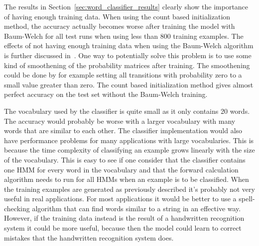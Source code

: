 The results in Section~\ref{sec:word_classifier_results} clearly show the importance of having enough training data.
When using the count based initialization method, the accuracy actually becomes worse after training the model with Baum-Welch for all test runs when using less than 800 training examples.
The effects of not having enough training data when using the Baum-Welch algorithm is further discussed in~\cite{Rabiner1989}.
One way to potentially solve this problem is to use some kind of smoothening of the probability matrices after training.
The smoothening could be done by for example setting all transitions with probability zero to a small value greater than zero.
The count based initialization method gives almost perfect accuracy on the test set without the Baum-Welch training.

The vocabulary used by the classifier is quite small as it only contains 20 words.
The accuracy would probably be worse with a larger vocabulary with many words that are similar to each other.
The classifier implementation would also have performance problems for many applications with large vocabularies.
This is because the time complexity of classifying an example grows linearly with the size of the vocabulary.
This is easy to see if one consider that the classifier contains one HMM for every word in the vocabulary and that the forward calculation algorithm needs to run for all HMMs when an example is to be classified.
When the training examples are generated as previously described it's probably not very useful in real applications.
For most applications it would be better to use a spell-checking algorithm that can find words similar to a string in an effective way.
However, if the training data instead is the result of a handwritten recognition system it could be more useful, because then the model could learn to correct mistakes that the handwritten recognition system does.
